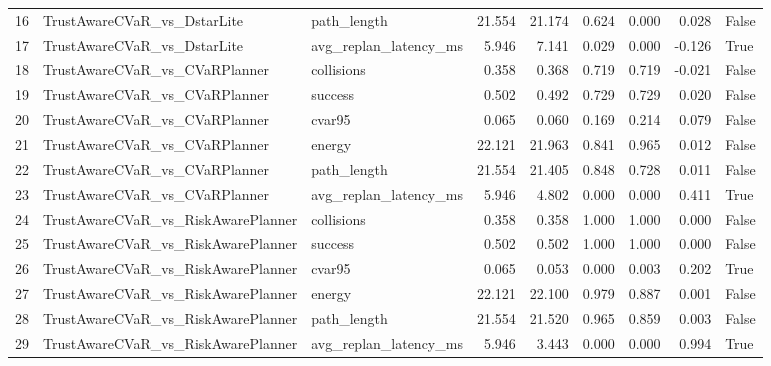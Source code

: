 \begin{table}
\begin{tabular}{lllrrrrrl}
16 & TrustAwareCVaR\_vs\_DstarLite & path\_length & 21.554 & 21.174 & 0.624 & 0.000 & 0.028 & False \\
17 & TrustAwareCVaR\_vs\_DstarLite & avg\_replan\_latency\_ms & 5.946 & 7.141 & 0.029 & 0.000 & -0.126 & True \\
18 & TrustAwareCVaR\_vs\_CVaRPlanner & collisions & 0.358 & 0.368 & 0.719 & 0.719 & -0.021 & False \\
19 & TrustAwareCVaR\_vs\_CVaRPlanner & success & 0.502 & 0.492 & 0.729 & 0.729 & 0.020 & False \\
20 & TrustAwareCVaR\_vs\_CVaRPlanner & cvar95 & 0.065 & 0.060 & 0.169 & 0.214 & 0.079 & False \\
21 & TrustAwareCVaR\_vs\_CVaRPlanner & energy & 22.121 & 21.963 & 0.841 & 0.965 & 0.012 & False \\
22 & TrustAwareCVaR\_vs\_CVaRPlanner & path\_length & 21.554 & 21.405 & 0.848 & 0.728 & 0.011 & False \\
23 & TrustAwareCVaR\_vs\_CVaRPlanner & avg\_replan\_latency\_ms & 5.946 & 4.802 & 0.000 & 0.000 & 0.411 & True \\
24 & TrustAwareCVaR\_vs\_RiskAwarePlanner & collisions & 0.358 & 0.358 & 1.000 & 1.000 & 0.000 & False \\
25 & TrustAwareCVaR\_vs\_RiskAwarePlanner & success & 0.502 & 0.502 & 1.000 & 1.000 & 0.000 & False \\
26 & TrustAwareCVaR\_vs\_RiskAwarePlanner & cvar95 & 0.065 & 0.053 & 0.000 & 0.003 & 0.202 & True \\
27 & TrustAwareCVaR\_vs\_RiskAwarePlanner & energy & 22.121 & 22.100 & 0.979 & 0.887 & 0.001 & False \\
28 & TrustAwareCVaR\_vs\_RiskAwarePlanner & path\_length & 21.554 & 21.520 & 0.965 & 0.859 & 0.003 & False \\
29 & TrustAwareCVaR\_vs\_RiskAwarePlanner & avg\_replan\_latency\_ms & 5.946 & 3.443 & 0.000 & 0.000 & 0.994 & True \\
\bottomrule
\end{tabular}
\end{table}
